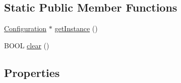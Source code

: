 \subsection*{\-Static \-Public \-Member \-Functions}
\begin{DoxyCompactItemize}
\item 
\hyperlink{interface_configuration}{\-Configuration} $\ast$ \hyperlink{interface_configuration_ae327d26e81014cf46b25802478fe9b8e}{get\-Instance} ()
\item 
\-B\-O\-O\-L \hyperlink{interface_configuration_a2870ffed6b7b5ec09c37a9d1701ed9f2}{clear} ()
\end{DoxyCompactItemize}
\subsection*{\-Properties}

